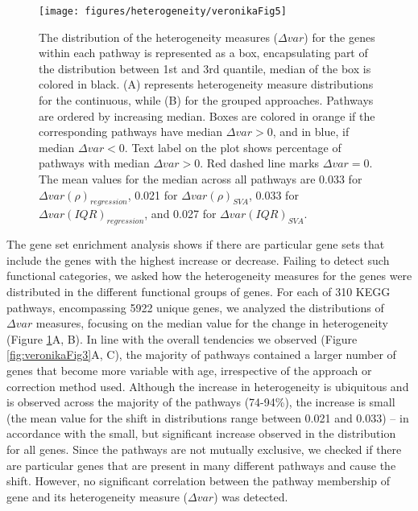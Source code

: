 \documentclass[12pt,twoside]{unicam}
\begin{document}
\begin{figure}

{\centering \texttt{[image: figures/heterogeneity/veronikaFig5]} 

}

\caption[Distributions of the heterogeneity measures obtained using a combination of continuous and grouped approaches with regression and SVA-correction for the individual pathways in KEGG database.]{The distribution of the heterogeneity measures ($\Delta var$) for the genes within each pathway is represented as a box, encapsulating part of the distribution between 1st and 3rd quantile, median of the box is colored in black. (A) represents heterogeneity measure distributions for the continuous, while (B) for the grouped approaches. Pathways are ordered by increasing median. Boxes are colored in orange if the corresponding pathways have median $\Delta var > 0$, and in blue, if median $\Delta var < 0$. Text label on the plot shows percentage of pathways with median $\Delta var > 0$. Red dashed line marks $\Delta var = 0$. The mean values for the median across all pathways are 0.033 for $\Delta var(\rho)_{regression}$, 0.021 for $\Delta var(\rho)_{SVA}$, 0.033 for $\Delta var(IQR)_{regression}$, and 0.027 for $\Delta var(IQR)_{SVA}$.}\label{fig:veronikaFig5}
\end{figure}

The gene set enrichment analysis shows if there are particular gene sets that include the genes with the highest increase or decrease. Failing to detect such functional categories, we asked how the heterogeneity measures for the genes were distributed in the different functional groups of genes. For each of 310 KEGG pathways, encompassing 5922 unique genes, we analyzed the distributions of \(\Delta var\) measures, focusing on the median value for the change in heterogeneity (Figure \ref{fig:veronikaFig5}A, B). In line with the overall tendencies we observed (Figure \ref{fig:veronikaFig3}A, C), the majority of pathways contained a larger number of genes that become more variable with age, irrespective of the approach or correction method used. Although the increase in heterogeneity is ubiquitous and is observed across the majority of the pathways (74-94\%), the increase is small (the mean value for the shift in distributions range between 0.021 and 0.033) -- in accordance with the small, but significant increase observed in the distribution for all genes. Since the pathways are not mutually exclusive, we checked if there are particular genes that are present in many different pathways and cause the shift. However, no significant correlation between the pathway membership of gene and its heterogeneity measure (\(\Delta var\)) was detected.
\end{document}
